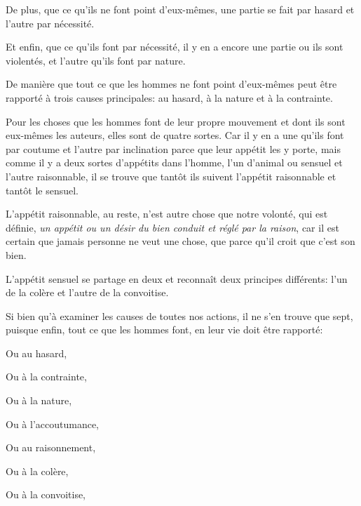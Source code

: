 De plus, que ce qu'ils ne font point d'eux-mêmes, une partie se fait par hasard et l'autre par nécessité.

Et enfin, que ce qu'ils font par nécessité, il y en a encore une partie ou ils sont violentés, et l'autre qu'ils font par nature.

De manière que tout ce que les hommes ne font point d'eux-mêmes peut être rapporté à trois causes principales: au hasard, à la
nature et à la contrainte.

\bigbreak

Pour les choses que les hommes font de leur propre mouvement et dont ils sont eux-mêmes les auteurs, elles sont de quatre
sortes. Car il y en a une qu'ils font par coutume et l'autre par inclination parce que leur appétit les y porte, mais
comme il y a deux sortes d'appétits dans l'homme, l'un d'animal ou sensuel et l'autre raisonnable, il se trouve que tantôt
ils suivent l'appétit raisonnable et tantôt le sensuel.

L'appétit raisonnable, au reste, n'est autre chose que notre volonté, qui est définie, \emph{un appétit ou un désir du bien
conduit et réglé par la raison}, car il est certain que jamais personne ne veut une chose, que parce qu'il croit que c'est
son bien. 

L'appétit sensuel se partage en deux et reconnaît deux principes différents: l'un de la colère et l'autre de la convoitise.

\bigbreak

Si bien qu'à examiner les causes de toutes nos actions, il ne s'en trouve que sept, puisque enfin, tout ce que les hommes
font, en leur vie doit être rapporté:

\begin{emphpar}
	Ou au hasard,

	Ou à la contrainte,

	Ou à la nature,

	Ou à l'accoutumance,

	Ou au raisonnement,

	Ou à la colère,

	Ou à la convoitise,
\end{emphpar}

